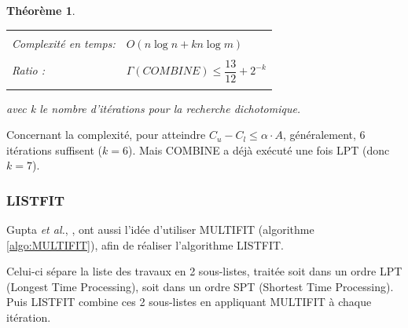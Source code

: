 \documentclass[a4paper,12pt]{report}
\theoremstyle{plain}				%
\newtheorem{theoreme}{Théorème}	%
\theoremstyle{definition}				%
\begin{document}
\begin{theoreme}
\begin{flushleft}
\begin{tabular}{|p{8cm}p{6cm}|}
\hline
& \\
Complexité en temps: & $O(n \log n + kn \log m)$
\\	%
& \\
Ratio \cite{gupta2001listfit}: & $\Gamma(COMBINE) \leq \dfrac{13}{12} + 2^{-k}$
\\
& \\
\hline
\end{tabular}
\end{flushleft}
avec k le nombre d'itérations pour la recherche dichotomique.
\end{theoreme}

Concernant la complexité, pour atteindre
$C_u - C_l \leq \alpha \cdot A$, généralement, 6 itérations suffisent
($k=6$).
Mais COMBINE a déjà exécuté une fois LPT (donc $k=7$).


\subsubsection{LISTFIT}

Gupta \emph{et al.}, \cite{gupta2001listfit}, ont aussi l'idée
d'utiliser MULTIFIT (algorithme \ref{algo:MULTIFIT}), afin de réaliser l'algorithme
LISTFIT.

Celui-ci sépare la liste des travaux en 2 sous-listes, traitée soit
dans un ordre LPT (Longest Time Processing), soit dans un ordre SPT
(Shortest Time Processing).
Puis LISTFIT combine ces 2 sous-listes en appliquant MULTIFIT à chaque
itération.
\end{document}
